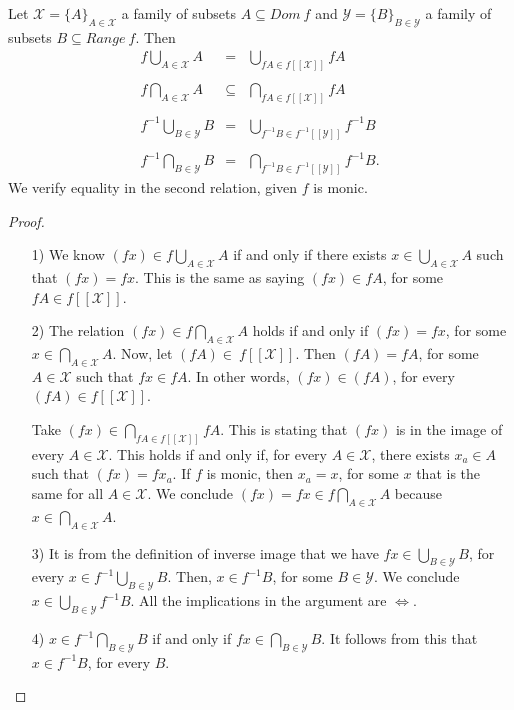\documentclass [12pt]{book}
\begin{document}
\begin{proposition}Let $\mathcal{X}=\{A\}_{A\in\mathcal{X}}$ a family of subsets $A\subseteq Dom~f$ and $\mathcal{Y}=\{B\}_{B\in\mathcal{Y}}$ a family of subsets $B\subseteq Range~f$. Then \begin{eqnarray}f\bigcup_{A\in\mathcal{X}}A&=&\bigcup_{fA\in f[[\mathcal{X}]]} fA\\\nonumber\\\nonumber f\bigcap_{A\in\mathcal{X}}A&\subseteq&\bigcap_{fA\in f[[\mathcal{X}]]}fA\\\nonumber\\\nonumber f^{-1}\bigcup_{B\in\mathcal{Y}}B&=&\bigcup_{f^{-1}B\in f^{-1}[[\mathcal{Y}]]} f^{-1}B\\\nonumber\\\nonumber  f^{-1}\bigcap_{B\in\mathcal{Y}}B&=&\bigcap_{f^{-1}B\in f^{-1}[[\mathcal{Y}]]}f^{-1}
B.\end{eqnarray}We verify equality in the second relation, given $f$ is monic.\end{proposition}

\begin{proof}\makebox[5pt][]{}\mbox {}\begin{itemize}\item[1)]We know $(fx)\in f\bigcup_{A\in\mathcal{X}}A$ if and only if there exists $x\in\bigcup_{A\in\mathcal{X}}A$ such that $(fx)=fx$. This is the same as saying $(fx)\in fA$, for some $fA\in f[[\mathcal{X}]]$.\item[2)]The relation $(fx)\in f\bigcap_{A\in\mathcal{X}}A$ holds if and only if $(fx)=fx$, for some $x\in \bigcap_{A\in\mathcal{X}}A$. Now, let $(fA)\in\ f[[\mathcal{X}]]$. Then $(fA)=fA$, for some $A\in\mathcal{X}$ such that $fx\in fA$. In other words, $(fx)\in(fA)$, for every $(fA)\in f[[\mathcal{X}]]$.

Take $(fx)\in\bigcap_{fA\in f[[\mathcal{X}]]}fA$. This is stating that $(fx)$ is in the image of every $A\in\mathcal{X}$. This holds if and only if, for every $A\in\mathcal{X}$, there exists $x_a\in A$ such that $(fx)=fx_a$. If $f$ is monic, then  $x_a=x$, for some $x$ that is the same for all $A\in\mathcal{X}$. We conclude $(fx)=fx\in f\bigcap_{A\in\mathcal{X}}A$ because $x\in\bigcap_{A\in\mathcal{X}}A$.\item[3)]It is from the definition of inverse image that we have $fx\in\bigcup_{B\in\mathcal{Y}}B$, for every $x\in f^{-1}\bigcup_{B\in\mathcal{Y}}B$. Then, $x\in f^{-1}B$, for some $B\in\mathcal{Y}$. We conclude $x\in\bigcup_{B\in\mathcal{Y}}f^{-1}B$. All the implications in the argument are $\Leftrightarrow$.\item[4)]$x\in f^{-1}\bigcap_{B\in\mathcal{Y}}B$ if and only if $fx\in\bigcap_{B\in\mathcal{Y}}B$. It follows from this that $x\in f^{-1}B$, for every $B$.\end{itemize}\end{proof}
\end{document}
